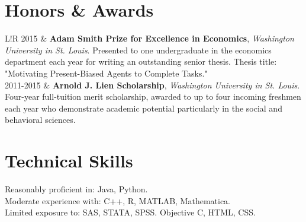 \documentclass[10pt]{article}
\newcommand\VRule{\color{lightgray}\vrule width 0.5pt}
\begin{document}


\section*{Honors \& Awards}
\begin{tabular}{L!{\VRule}R}
2015 & \textbf{Adam Smith Prize for Excellence in Economics}, \emph{Washington University in St. Louis}.
\newline Presented to one undergraduate in the economics department each year for writing an outstanding senior thesis.  Thesis title: "Motivating Present-Biased Agents to Complete Tasks."
\\

2011-2015 & \textbf{Arnold J. Lien Scholarship}, \emph{Washington University in St. Louis}.
\newline Four-year full-tuition merit scholarship, awarded to up to four incoming freshmen each year who demonstrate academic potential particularly in the social and behavioral sciences.  
\\
\end{tabular}


\section*{Technical Skills}
Reasonably proficient in: Java, Python.  \\
Moderate experience with: C++, R, MATLAB, Mathematica. \\
Limited exposure to: SAS, STATA, SPSS.  Objective C, HTML, CSS.  

\end{document}
